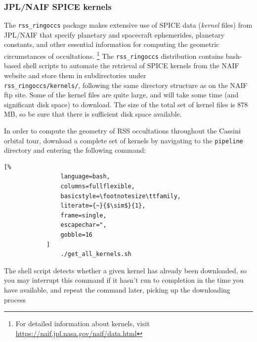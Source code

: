 \documentclass[titlepage, 12pt]{article}
\begin{document}
        \subsubsection{JPL/NAIF SPICE kernels}
            \label{sec:spicekern}
            The \texttt{rss\_ringoccs} package makes
            extensive use of SPICE data (\textit{kernel} files)
            from JPL/NAIF that specify planetary and
            spacecraft ephemerides, planetary constants,
            and other essential information for computing
            the geometric circumstances of occultations.%
            \footnote{For detailed information about kernels, visit
                      \url{https://naif.jpl.nasa.gov/naif/data.html}}
            The \texttt{rss\_ringoccs} distribution contains bash-based
            shell scripts to automate the retrieval of
            SPICE kernels from the NAIF website
            and store them in subdirectories under\\
            \texttt{rss\_ringoccs/kernels/}, following the same
            directory structure as on the NAIF ftp site. 
            Some of the kernel files are quite large,
            and will take some time (and significant disk space)
            to download. The size of the total set of kernel files 
            is 878 MB, so be sure that there is sufficient disk space
            available.
            \par\hfill\par
                        In order to compute the geometry of RSS occultations
            throughout the Cassini orbital tour, download a complete set of kernels by navigating to the \texttt{pipeline} directory and entering the following command:
            \begin{lstlisting}[%
                language=bash,
                columns=fullflexible,
                basicstyle=\footnotesize\ttfamily,
                literate={~}{$\sim$}{1},
                frame=single,
                escapechar=",
                gobble=16
            ]
                ./get_all_kernels.sh
            \end{lstlisting}
            \par\hfill\par
            The shell script detects whether
            a given kernel has already
            been downloaded, so you may interrupt this
            command if it hasn't run to completion in
            the time you have available, and repeat the
            command later, picking up the downloading process
\end{document}
